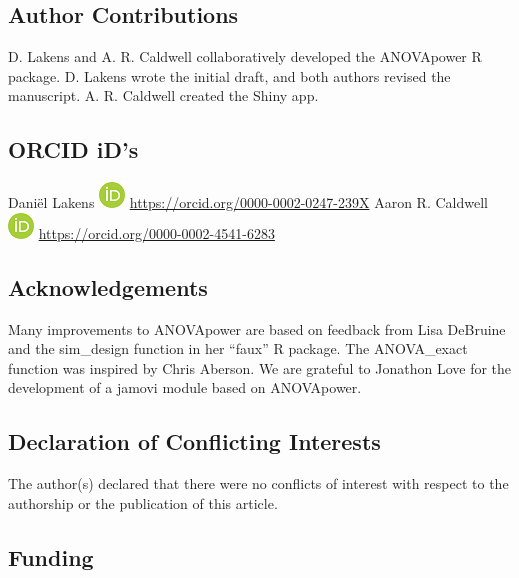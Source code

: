 \documentclass[,jou,floatsintext]{apa6}
\begin{document}
\hypertarget{author-contributions}{%
\subsection{Author Contributions}\label{author-contributions}}

D. Lakens and A. R. Caldwell collaboratively developed the ANOVApower R package. D. Lakens wrote the initial draft, and both authors revised the manuscript. A. R. Caldwell created the Shiny app.

\hypertarget{orcid-ids}{%
\subsection{ORCID iD's}\label{orcid-ids}}

Daniël Lakens \includegraphics{screenshots/orcid.png} \url{https://orcid.org/0000-0002-0247-239X}
Aaron R. Caldwell \includegraphics{screenshots/orcid.png} \url{https://orcid.org/0000-0002-4541-6283}

\hypertarget{acknowledgements}{%
\subsection{Acknowledgements}\label{acknowledgements}}

Many improvements to ANOVApower are based on feedback from Lisa DeBruine and the sim\_design function in her \enquote{faux} R package. The ANOVA\_exact function was inspired by Chris Aberson. We are grateful to Jonathon Love for the development of a jamovi module based on ANOVApower.

\hypertarget{declaration-of-conflicting-interests}{%
\subsection{Declaration of Conflicting Interests}\label{declaration-of-conflicting-interests}}

The author(s) declared that there were no conflicts of interest with respect to the authorship or the publication of this article.

\hypertarget{funding}{%
\subsection{Funding}\label{funding}}
\end{document}
